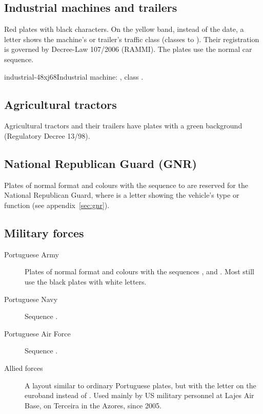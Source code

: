 

\subsection{Industrial machines and trailers}

Red plates with black characters. On the yellow band, instead of the date, a
letter shows the machine's or trailer's traffic class (classes  to
). Their registration is governed by Decree-Law 107/2006 (RAMMI). The
plates use the normal car sequence.

%
          {industrial-48xj68}{Industrial machine: , class .}

\subsection{Agricultural tractors}

Agricultural tractors and their trailers have plates with a green background
(Regulatory Decree 13/98).

\subsection{National Republican Guard (GNR)}

Plates of normal format and colours with the sequence  to
 are reserved for the National Republican Guard, where
 is a letter showing the vehicle's type or function (see
appendix~\ref{sec:gnr}).

\subsection{Military forces}

\begin{description}
  \item[Portuguese Army] Plates of normal format and colours with the sequences
    ,  and . Most still use the
    black plates with white letters.
  \item[Portuguese Navy] Sequence .
  \item[Portuguese Air Force] Sequence .
  \item[Allied forces] A layout similar to ordinary Portuguese plates, but with
    the letter  on the euroband instead of . Used mainly by US
    military personnel at Lajes Air Base, on Terceira in the Azores, since 2005.
\end{description}

